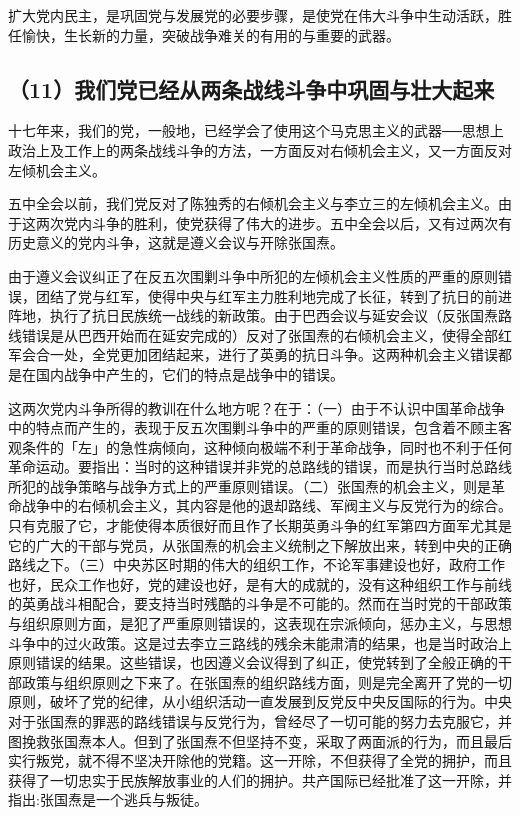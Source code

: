 扩大党内民主，是巩固党与发展党的必要步骤，是使党在伟大斗争中生动活跃，胜任愉快，生长新的力量，突破战争难关的有用的与重要的武器。

\subsection{（11）我们党已经从两条战线斗争中巩固与壮大起来}

十七年来，我们的党，一般地，已经学会了使用这个马克思主义的武器──思想上政治上及工作上的两条战线斗争的方法，一方面反对右倾机会主义，又一方面反对左倾机会主义。

五中全会以前，我们党反对了陈独秀的右倾机会主义与李立三的左倾机会主义。由于这两次党内斗争的胜利，使党获得了伟大的进步。五中全会以后，又有过两次有历史意义的党内斗争，这就是遵义会议与开除张国焘。

由于遵义会议纠正了在反五次围剿斗争中所犯的左倾机会主义性质的严重的原则错误，团结了党与红军，使得中央与红军主力胜利地完成了长征，转到了抗日的前进阵地，执行了抗日民族统一战线的新政策。由于巴西会议与延安会议（反张国焘路线错误是从巴西开始而在延安完成的）反对了张国焘的右倾机会主义，使得全部红军会合一处，全党更加团结起来，进行了英勇的抗日斗争。这两种机会主义错误都是在国内战争中产生的，它们的特点是战争中的错误。

这两次党内斗争所得的教训在什么地方呢？在于：（一）由于不认识中国革命战争中的特点而产生的，表现于反五次围剿斗争中的严重的原则错误，包含着不顾主客观条件的「左」的急性病倾向，这种倾向极端不利于革命战争，同时也不利于任何革命运动。要指出：当时的这种错误并非党的总路线的错误，而是执行当时总路线所犯的战争策略与战争方式上的严重原则错误。（二）张国焘的机会主义，则是革命战争中的右倾机会主义，其内容是他的退却路线、军阀主义与反党行为的综合。只有克服了它，才能使得本质很好而且作了长期英勇斗争的红军第四方面军尤其是它的广大的干部与党员，从张国焘的机会主义统制之下解放出来，转到中央的正确路线之下。（三）中央苏区时期的伟大的组织工作，不论军事建设也好，政府工作也好，民众工作也好，党的建设也好，是有大的成就的，没有这种组织工作与前线的英勇战斗相配合，要支持当时残酷的斗争是不可能的。然而在当时党的干部政策与组织原则方面，是犯了严重原则错误的，这表现在宗派倾向，惩办主义，与思想斗争中的过火政策。这是过去李立三路线的残余未能肃清的结果，也是当时政治上原则错误的结果。这些错误，也因遵义会议得到了纠正，使党转到了全般正确的干部政策与组织原则之下来了。在张国焘的组织路线方面，则是完全离开了党的一切原则，破坏了党的纪律，从小组织活动一直发展到反党反中央反国际的行为。中央对于张国焘的罪恶的路线错误与反党行为，曾经尽了一切可能的努力去克服它，并图挽救张国焘本人。但到了张国焘不但坚持不变，采取了两面派的行为，而且最后实行叛党，就不得不坚决开除他的党籍。这一开除，不但获得了全党的拥护，而且获得了一切忠实于民族解放事业的人们的拥护。共产国际已经批准了这一开除，并指出:张国焘是一个逃兵与叛徒。

